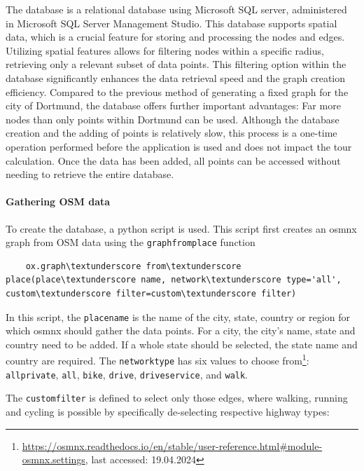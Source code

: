 The database is a relational database using Microsoft SQL server, administered in Microsoft SQL Server Management Studio.
This database supports spatial data, which is a crucial feature for storing and processing the nodes and edges.
Utilizing spatial features allows for filtering nodes within a specific radius, retrieving only a relevant subset of data points.
This filtering option within the database significantly enhances the data retrieval speed and the graph creation efficiency.
Compared to the previous method of generating a fixed graph for the city of Dortmund, the database offers further important advantages:
Far more nodes than only points within Dortmund can be used.
Although the database creation and the adding of points is relatively slow, this process is a one-time operation performed before the application is used and does not impact the tour calculation. 
Once the data has been added, all points can be accessed without needing to retrieve the entire database.

\paragraph{Gathering OSM data}

To create the database, a python script is used. 
This script first creates an osmnx graph from OSM data using the \texttt{graph\textunderscore from\textunderscore place} function
\begin{lstlisting}
	ox.graph\textunderscore from\textunderscore place(place\textunderscore name, network\textunderscore type='all', custom\textunderscore filter=custom\textunderscore filter)
\end{lstlisting}

In this script, the \texttt{place\textunderscore name} is the name of the city, state, country or region for which osmnx should gather the data points.
For a city, the city's name, state and country need to be added. 
If a whole state should be selected, the state name and country are required.
The \texttt{network\textunderscore type} has six values to choose from\footnote{\url{https://osmnx.readthedocs.io/en/stable/user-reference.html\#module-osmnx.settings}, last accessed: 19.04.2024}: \texttt{all\textunderscore private}, \texttt{all}, \texttt{bike}, \texttt{drive}, \texttt{drive\textunderscore service}, and \texttt{walk}. 

The \texttt{custom\textunderscore filter} is defined to select only those edges, where walking, running and cycling is possible by specifically de-selecting respective highway types:

